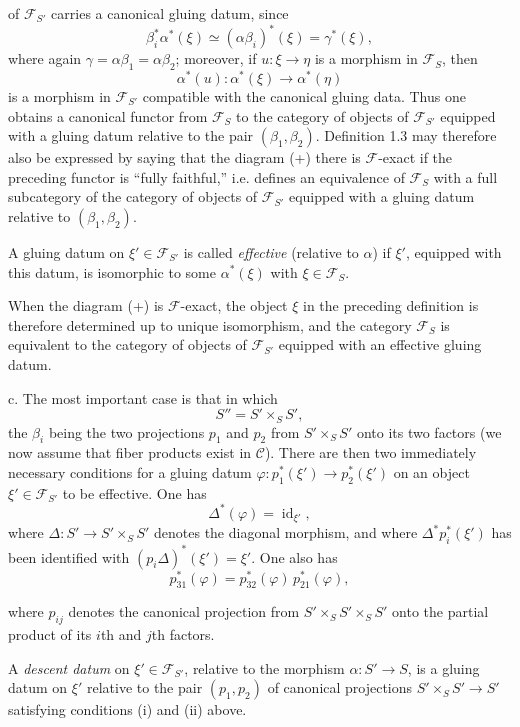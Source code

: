 of $\mathcal F_{S'}$ carries a canonical gluing datum, since
\[
  \beta_i^*\alpha^*(\xi)\simeq(\alpha\beta_i)^*(\xi)=\gamma^*(\xi),
\]
where again $\gamma=\alpha\beta_1=\alpha\beta_2$; moreover, if
$u:\xi\longrightarrow\eta$ is a morphism in $\mathcal F_S$, then
\[
  \alpha^*(u):\alpha^*(\xi)\longrightarrow\alpha^*(\eta)
\]
is a morphism in $\mathcal F_{S'}$ compatible with the canonical gluing data.
Thus one obtains a canonical functor from $\mathcal F_S$ to the category of
objects of $\mathcal F_{S'}$ equipped with a gluing datum relative to the pair
$(\beta_1,\beta_2)$. Definition 1.3 may therefore also be expressed by saying
that the diagram (+) there is $\mathcal F$-exact if the preceding functor is
“fully faithful,” i.e. defines an equivalence of $\mathcal F_S$ with a full
subcategory of the category of objects of $\mathcal F_{S'}$ equipped with a
gluing datum relative to $(\beta_1,\beta_2)$.

 A gluing datum on
$\xi'\in\mathcal F_{S'}$ is called \emph{effective} (relative to $\alpha$) if
$\xi'$, equipped with this datum, is isomorphic to some $\alpha^*(\xi)$ with
$\xi\in\mathcal F_S$.

When the diagram (+) is $\mathcal F$-exact, the object $\xi$ in the preceding
definition is therefore determined up to unique isomorphism, and the category
$\mathcal F_S$ is equivalent to the category of objects of
$\mathcal F_{S'}$ equipped with an effective gluing datum.

\medskip\noindent
c. The most important case is that in which
\[
  S''=S'\times_S S',
\]
the $\beta_i$ being the two projections $p_1$ and $p_2$ from
$S'\times_S S'$ onto its two factors (we now assume that fiber products exist
in $\mathcal C$). There are then two immediately necessary conditions for a
gluing datum $\varphi:p_1^*(\xi')\longrightarrow p_2^*(\xi')$ on an object
$\xi'\in\mathcal F_{S'}$ to be effective. One has
\[
  \tag{i}
  \Delta^*(\varphi)=\operatorname{id}_{\xi'},
\]
where $\Delta:S'\longrightarrow S'\times_S S'$ denotes the diagonal morphism,
and where $\Delta^*p_i^*(\xi')$ has been identified with
$(p_i\Delta)^*(\xi')=\xi'$. One also has
\[
  \tag{ii}
  p_{31}^*(\varphi)=p_{32}^*(\varphi)\,p_{21}^*(\varphi),
\]

where $p_{ij}$ denotes the canonical projection from
$S'\times_S S'\times_S S'$ onto the partial product of its $i$th and $j$th
factors.

 A \emph{descent datum} on
$\xi'\in\mathcal F_{S'}$, relative to the morphism
$\alpha:S'\longrightarrow S$, is a gluing datum on $\xi'$ relative to the
pair $(p_1,p_2)$ of canonical projections
$S'\times_S S'\longrightarrow S'$ satisfying conditions (i) and (ii) above.

